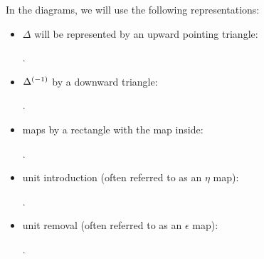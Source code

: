 In the diagrams, we will use the following representations:
\begin{itemize}
  \item $\Delta$ will be represented by an upward pointing triangle: .
  \item ${\Delta}^{(-1)}$ by a downward triangle: .
  \item maps by a rectangle with the map inside: .
  \item unit introduction (often referred to as an $\eta$ map): .
  \item unit removal (often referred to as an $\epsilon$ map): .
\end{itemize}

